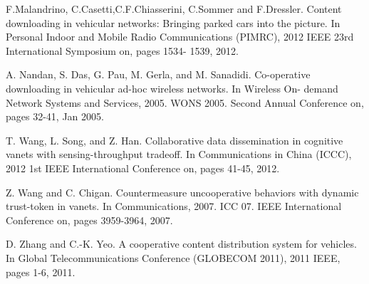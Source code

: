 \documentclass{acm_proc_article-sp}
\begin{document}
\begin{thebibliography}{1}
 F.Malandrino, C.Casetti,C.F.Chiasserini, C.Sommer and F.Dressler. Content downloading in vehicular networks: Bringing parked cars into the picture. In Personal Indoor and Mobile Radio Communications (PIMRC), 2012 IEEE 23rd International Symposium on, pages 1534- 1539, 2012.

 A. Nandan, S. Das, G. Pau, M. Gerla, and M. Sanadidi. Co-operative downloading in vehicular ad-hoc wireless networks. In Wireless On- demand Network Systems and Services, 2005. WONS 2005. Second Annual Conference on, pages 32-41, Jan 2005.

 T. Wang, L. Song, and Z. Han. Collaborative data dissemination in cognitive vanets with sensing-throughput tradeoff. In Communications in China (ICCC), 2012 1st IEEE International Conference on, pages 41-45, 2012.

 Z. Wang and C. Chigan. Countermeasure uncooperative behaviors with dynamic trust-token in vanets. In Communications, 2007. ICC 07. IEEE International Conference on, pages 3959-3964, 2007.

 D. Zhang and C.-K. Yeo. A cooperative content distribution system for vehicles. In Global Telecommunications Conference (GLOBECOM 2011), 2011 IEEE, pages 1-6, 2011.

\end{thebibliography}
\end{document}

